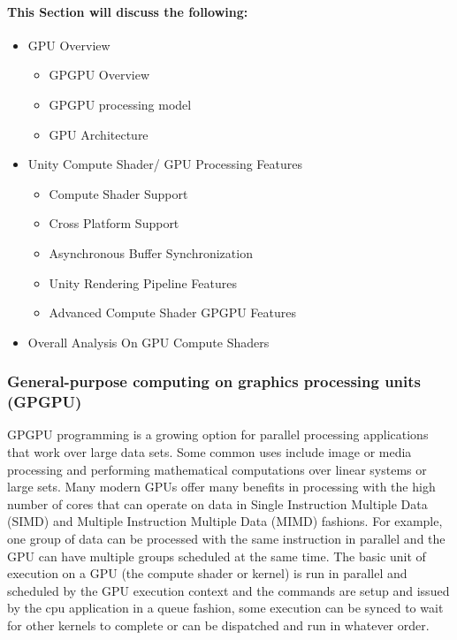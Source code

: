 \documentclass[a4paper,10pt]{article}
\begin{document}
\paragraph{This Section will discuss the following:}
\begin{itemize}
	\item GPU Overview 
	\begin{itemize}
		\item GPGPU Overview
		\item GPGPU processing model
		\item GPU Architecture
	\end{itemize}
	\item Unity Compute Shader/ GPU Processing Features
	\begin{itemize}
		\item Compute Shader Support
		\item Cross Platform Support
		\item Asynchronous Buffer Synchronization
		\item Unity Rendering Pipeline Features
		\item Advanced Compute Shader GPGPU Features
	\end{itemize}
	\item Overall Analysis On GPU Compute Shaders
\end{itemize}
\pagebreak
\subsubsection{General-purpose computing on graphics processing units (GPGPU)}
GPGPU programming is a growing option for parallel processing applications that work over large data sets. Some common uses include image or media processing and 
performing mathematical computations over linear systems or large sets. Many modern GPUs offer many benefits in processing with the high number of cores that can operate on data 
in Single Instruction Multiple Data (SIMD) and Multiple Instruction Multiple Data (MIMD) fashions. For example, one group of data can be processed with the same instruction in parallel 
and the GPU can have multiple groups scheduled at the same time. The basic unit of execution on a GPU (the compute shader or kernel) is run in parallel and scheduled by the GPU execution context
and the commands are setup and issued by the cpu application in a queue fashion, some execution can be synced to wait for other kernels to complete or can be dispatched and run in whatever order.
\end{document}
